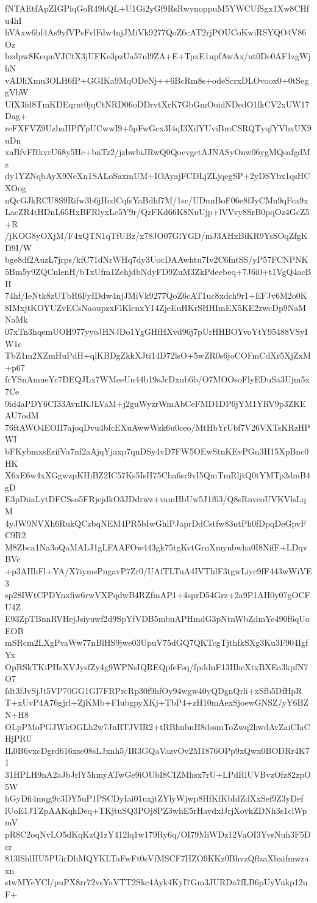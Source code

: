 fNTAEtfApZIGPiqGoR49hQL+U1Gi2yGf9RsRwynoppuM5YWCUfSgx1Xw8CHfu4hI
hVAxw6hf4As9yfVPsFvlFdw4njJMiVk9277QoZ6cAT2rjPOUCoKwiRSYQO4V86Oz
bzdpw8KeqmVJCtX3jUFKe3pzUa57nl9ZA+E+TpxE1upfAwAx/ut0De0AF1zgWjhN
vADliXmu3OLH6fP+GGIKa9MqODeNj++6BcRm8s+odeScrxDLOvoox0+0tSeggVhW
UfX3fd8TmKDEqrnt0jqCtNRD06oDDrvtXrK7GbGmOoidNDedO1lkCV2xUW17Dag+
reFXFVZ9UzbaHPfYpUCwwI9+5pFwGcx3I4qI3XilYUviBmCSRQTyqfYVbxUX9uDn
xaBfvFRkvrU68y5Hc+bnTz2/jzbwbiJRwQ0QocvgctAJNASyOnw06ygMQsafgdMz
dy1YZNqbAyX9NeXn1SALoSaxmUM+IOAyajFCDLjZLjqegSP+2yDSYbx1qsHCXOog
nQcGJkRCU8S9Rifw3b6jHcdCqfsYaBdhf7M/1sc/UDnnBoF06e8fJyCMn9qFca9x
LacZR4tHDnL65HxBFRlyxLe5Y9r/QzFKd66K8NuUjp+lVVvy8SrB0pqOz4GcZ5+R
/jKOG8yOXjM/F4xQTN1qTfUBz/x78JO07GlYGD/mJ3AHxBiKR9YsSOqZfgKD9I/W
bge8df2AuzL7jrps/kfC71dNrWHq7dy3UocDAAwhtu7Iv2C6fntSS/yP57FCNPNK
5Bm5y9ZQCnlenH/bTxUfm1ZehjdbNdyFD9ZuM3ZkPdeebeq+7J6i0+t1VgQ4acBH
74hf/IeNtk8zUTbR6FyIDdw4njJMiVk9277QoZ6cAT1uc8xdch9r1+EFJv6M2o0K
8IMxjtKOYUZvECsNaoupzxFlKlcnxY14ZjeEuHKrSHHImEX5KE2zwcDp9NaMNaMk
07xTn3hqemUOH977yyoJHNJDo1YgGHfHXvd96j7pUrHHBOYvoYtY95488VSyIW1c
TbZ1m2XZmHuPdH+qlKBDgZkkXJti14D72lsO+5wZR0s6joCOFmCdXr5XjZxM+p67
frYSnAmueYc7DEQJLx7WMeeUn44b19sJcDxub6b/O7MOOsoFlyEDuSa3Ujm5x7Ce
9id4aPDY6CI33AvnIKJLVaM+j2guWyzrWmAbCeFMD1DP6jYM1YRV9p3ZKEAU7odM
76ftAWO4EOII7ajoqDvu4bfcEXuAwwWzk6u0ceo/MtHbYrUbf7V26VXTsKRzHPWI
bFKybmxsErifVa7nf2aAjqYjaxp7qnDSy4vD7FW5OEwStnKEvPGn3H15XpBnc0HK
X6xE6w4xXGgwzpKHiBZ2IC57Ks5IsH75Cha6sr9vI5QmTmRljtQ0tYMTp2dmB4gD
E3pDiiaLytDFCSso5FRjejdkO3JDdrwz+vamHbUw5J1f63/Q8sRnveoUVKVlsLqM
4yJW9NVXh6RukQCzbqNEM4PR5bIwGhlPJaprDdCstfw83utPh0fDpqDeGpvFC9R2
M8Zbca1Na3oQaMALJ1gLFAAFOw443gk75tgKvtGrnXmynbwha0I8NifF+LDqvBVc
+p3AHhFl+YA/X7iymsPngavP7Zr0/UAfTLTuA4IVThlF3tgwLiyc9fF443wWiVE3
sp28IWtCPDYnxfiw6rwVXPqdwB4RZfmAP1+4sprD54Grz+2a9P1AH0y07gOCFU4Z
E93ZpTBnnRVHejJsiyuwf2d9SpYfVDB5mbuAPHmdG3pNtnWbZdmYe490f6qUoEOB
mSRcm2LXgPvaWw77nBlHS9jwe03UpuV75dGQ7QKTcgTjthfkSXg3Ku3F904IgfYx
OpRSkTKiPHsXVJysfZy4g9WPNsIQREQpfeFsq/fpddnF13HhcXtxBXEa3kpfN7O7
fdt3fJvSjJt5VP70GG1GI7FRPrcRp30f9hfOy94wgw40yQDgnQrli+xSfb5DfHpR
T+xUvP4A76gjrl+ZjKMb+FIubgpyXKj+TbP4+zH10mAexSjoewGNSZ/yY6BZN+H8
OLpPMoPGJWkOGLh2w7JnRTJVIR2+tRBhubnH8dssmToZwq2hwdAvZaiCIaCHjPRU
IL0B6vxcDgrd616xse08sLJxnh5/IR3GQaVazvOv2M1876OPp9xQwx0BODRr4K71
31HPLH9nA2aJbJrlY5hmyATwGe9iOUbI8CIZMhsx7rU+LPdRlUVBvzOfz82zpO5W
hGyDfi4mqg9c3DY5uP1PSCDyIai01uxjtZYlyWjwp8HfKfKbIdZdXxSef9Z3yDef
lUoE1JTZpAAKqhDeq+TKjtuSQ3POj8PZ3whE5rHavdxlJrjXovkZDNh3s1clWpmV
pR8C2oqNvLO5dKqKzQ1zY412lq1w179Ry6q/OI79MiWDz12VaOI3YvsNuh3F5Dcr
813lShlHU5PUirDhMQYKLTaFwFt0sVfMSCF7HZO9KKz0BhvzQflzaXbxifmwzaxn
stwMYeYCl/puPX8rr72vsYaVTT2Skc4Ayk4KyI7Gm3JURDa7fLB6pUyVukp12uF+
